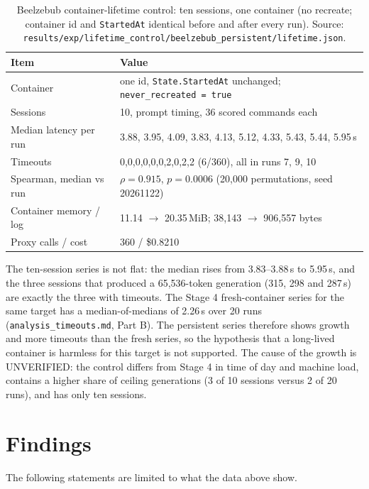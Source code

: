 \documentclass[a4paper,11pt]{article}
\begin{document}
\begin{table}[ht]
\centering
\caption{Beelzebub container-lifetime control: ten sessions, one container
(no recreate; container id and \texttt{StartedAt} identical before and after
every run). Source:
\texttt{results/exp/lifetime\_control/beelzebub\_persistent/lifetime.json}.}
\label{tab:lifetime}
\scriptsize
\begin{tabular}{@{}l p{11.2cm}@{}}
\toprule
Item & Value \\
\midrule
Container & one id, \texttt{State.StartedAt} unchanged; \texttt{never\_recreated = true} \\
Sessions & 10, prompt timing, 36 scored commands each \\
Median latency per run & 3.88, 3.95, 4.09, 3.83, 4.13, 5.12, 4.33, 5.43, 5.44, 5.95\,s \\
Timeouts & 0,0,0,0,0,0,2,0,2,2 (6/360), all in runs 7, 9, 10 \\
Spearman, median vs run & $\rho = 0.915$, $p = 0.0006$ (20,000 permutations, seed 20261122) \\
Container memory / log & 11.14 $\rightarrow$ 20.35\,MiB; 38,143 $\rightarrow$ 906,557 bytes \\
Proxy calls / cost & 360 / \$0.8210 \\
\bottomrule
\end{tabular}
\end{table}

The ten-session series is not flat: the median rises from 3.83--3.88\,s to
5.95\,s, and the three sessions that produced a 65,536-token generation (315,
298 and 287\,s) are exactly the three with timeouts. The Stage 4 fresh-container
series for the same target has a median-of-medians of 2.26\,s over 20 runs
(\texttt{analysis\_timeouts.md}, Part B). The persistent series therefore shows
growth and more timeouts than the fresh series, so the hypothesis that a
long-lived container is harmless for this target is not supported. The cause of
the growth is UNVERIFIED: the control differs from Stage 4 in time of day and
machine load, contains a higher share of ceiling generations (3 of 10 sessions
versus 2 of 20 runs), and has only ten sessions.

\section{Findings}

The following statements are limited to what the data above show.
\end{document}
